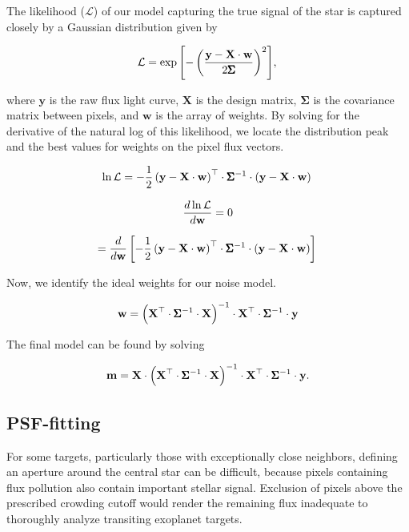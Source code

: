 \documentclass[12pt,preprint]{aastex}
\begin{document}
The likelihood ($\mathcal{L}$) of our model capturing the true signal of the star is captured closely by a Gaussian distribution given by

\[
\mathcal{L} = \exp{\left[-\left( \frac{\textbf{y}-\textbf{X}\cdot\textbf{w}}{2\pmb{\Sigma}} \right)^2 \right]}, \\
\]

where $\textbf{y}$ is the raw flux light curve, $\textbf{X}$ is the design matrix, $\pmb{\Sigma}$ is the covariance matrix between pixels, and $\textbf{w}$ is the array of weights. By solving for the derivative of the natural log of this likelihood, we locate the distribution peak and the best values for weights on the pixel flux vectors.

\[
\ln{\mathcal{L}} = - \frac{1}{2}\left(\textbf{y} - \textbf{X}\cdot\textbf{w} \right)^\top \cdot \pmb{\Sigma}^{-1} \cdot \left(\textbf{y} - \textbf{X}\cdot\textbf{w} \right) \\
\]

\[
\frac{d\ln{\mathcal{L}}}{d \textbf{w}} = 0 \\
\]

\[
=\frac{d}{d \textbf{w}} \left[ - \frac{1}{2} \left(\textbf{y} - \textbf{X}\cdot\textbf{w} \right)^\top \cdot \pmb{\Sigma}^{-1} \cdot \left(\textbf{y} - \textbf{X}\cdot\textbf{w} \right) \right] \\
\]

Now, we identify the ideal weights for our noise model.

\[
\textbf{w} = \left( \textbf{X}^\top \cdot \pmb{\Sigma}^{-1} \cdot \textbf{X} \right)^{-1} \cdot \textbf{X}^\top \cdot \pmb{\Sigma}^{-1} \cdot \textbf{y} \\
\]

The final model can be found by solving

\[
\textbf{m} = \textbf{X} \cdot \left( \textbf{X}^\top \cdot \pmb{\Sigma}^{-1} \cdot \textbf{X} \right)^{-1} \cdot \textbf{X}^\top \cdot \pmb{\Sigma}^{-1} \cdot \textbf{y}. \\
\]

\subsection{PSF-fitting}

For some targets, particularly those with exceptionally close neighbors, defining an aperture around the central star can be difficult, because pixels containing flux pollution also contain important stellar signal. Exclusion of pixels above the prescribed crowding cutoff would render the remaining flux inadequate to thoroughly analyze transiting exoplanet targets.
\end{document}
